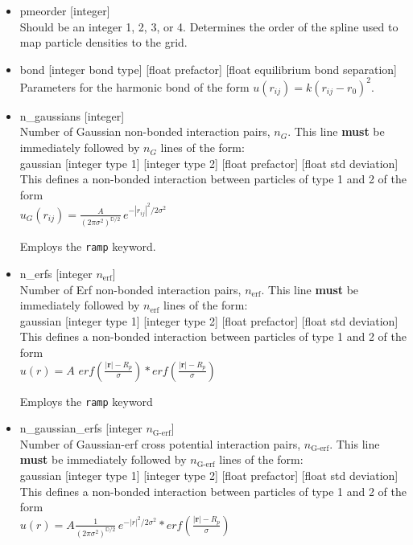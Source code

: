 \documentclass[12pt]{article}
\begin{document}
\begin{itemize}
  \item
    pmeorder [integer]
    \\[8pt]
    Should be an integer 1, 2, 3, or 4. Determines the order of the spline used to map particle densities to the grid.

  \item
    bond [integer bond type] [float prefactor] [float equilibrium bond separation]
    \\[8pt]
    Parameters for the harmonic bond of the form $u(r_{ij}) = k (r_{ij}-r_0)^2$.
    
  \item
    n\_gaussians [integer]
    \\[8pt]
    Number of Gaussian non-bonded interaction pairs, $n_G$. This line {\bf must} be immediately followed by $n_G$ lines of the form:
    \\[8pt]
    gaussian [integer type 1] [integer type 2] [float prefactor] [float std deviation]
    \\[8pt]
    This defines a non-bonded interaction between particles of type 1 and 2 of the form 
    \\
	$u_G(r_{ij}) = \frac{A}{(2\pi \sigma^2)^{\mathbb D/2} }\, e^{-|r_{ij}|^2/2\sigma^2}$

	Employs the \verb+ramp+ keyword.
	
  \item
    n\_erfs [integer $n_\text{erf}$]
    \\[8pt]
    Number of Erf non-bonded interaction pairs, $n_\text{erf}$. This line {\bf must} be immediately followed by $n_\text{erf}$ lines of the form:
    \\[8pt]
    gaussian [integer type 1] [integer type 2] [float prefactor] [float std deviation]
    \\[8pt]
    This defines a non-bonded interaction between particles of type 1 and 2 of the form 
    \\
	$u(r) = A  \,\, erf\left(\frac{\vert\mathbf{r}\vert - R_p}{\sigma}\right) * erf\left(\frac{\vert\mathbf{r}\vert - R_p}{\sigma}\right)$

	Employs the \verb+ramp+ keyword
	
  \item
    n\_gaussian\_erfs [integer $n_\text{G-erf}$]
    \\[8pt]
    Number of Gaussian-erf cross potential interaction pairs, $n_\text{G-erf}$. This line {\bf must} be immediately followed by $n_\text{G-erf}$ lines of the form:
    \\[8pt]
    gaussian [integer type 1] [integer type 2] [float prefactor] [float std deviation]
    \\[8pt]
    This defines a non-bonded interaction between particles of type 1 and 2 of the form 
    \\
    $u(r) = A \frac{1}{(2\pi \sigma^2)^{\mathbb D/2} }\, e^{-|r|^2/2\sigma^2}* erf\left(\frac{\vert\mathbf{r}\vert - R_p}{\sigma}\right)$


\end{itemize}
\end{document}
